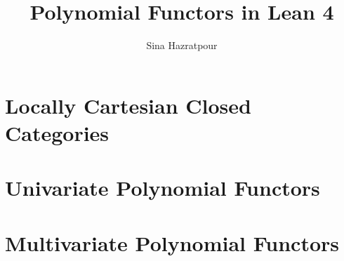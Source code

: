 \title{Polynomial Functors in Lean 4}
\author{Sina Hazratpour}


\maketitle

\chapter{Locally Cartesian Closed Categories}

\chapter{Univariate Polynomial Functors}

\chapter{Multivariate Polynomial Functors}


